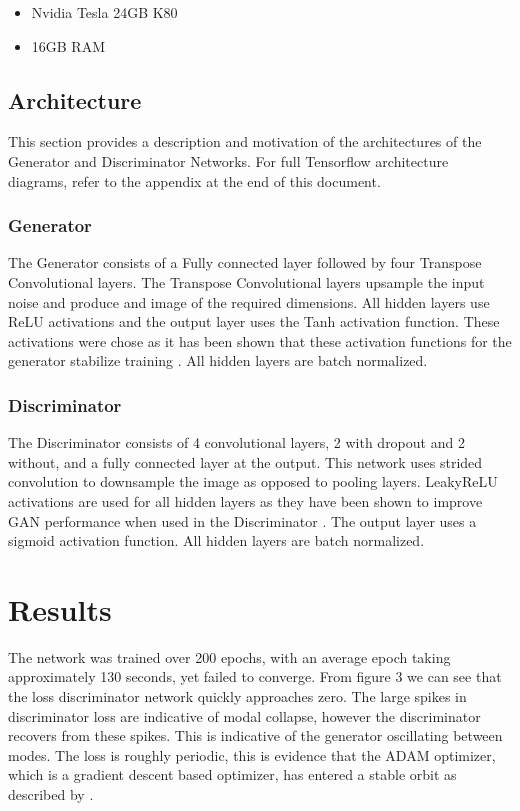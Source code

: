 \documentclass[conference]{IEEEtran}
\begin{document}
\begin{itemize}
    \item Nvidia Tesla 24GB K80 
    \item 16GB RAM 
\end{itemize}

\subsection{Architecture}

This section provides a description and motivation of the architectures of the Generator and Discriminator Networks. For full Tensorflow architecture diagrams, refer to the appendix at the end of this document.

\subsubsection{Generator}
The Generator consists of a Fully connected layer followed by four Transpose Convolutional layers. The Transpose Convolutional layers upsample the input noise and produce and image of the required dimensions.
All hidden layers use ReLU activations and the output layer uses the Tanh activation function. These activations were chose as it has been shown that these activation functions for the generator stabilize training \cite{radford2015unsupervised}. All hidden layers are batch normalized. 

\subsubsection{Discriminator}

The Discriminator consists of 4 convolutional layers, 2 with dropout and 2 without, and a fully connected layer at the output. This network uses strided convolution to downsample the image as opposed to pooling layers. LeakyReLU activations are used for all hidden layers as they have been shown to improve GAN performance when used in the Discriminator \cite{radford2015unsupervised}. The output layer uses a sigmoid activation function. All hidden layers are batch normalized.

\section{Results}

The network was trained over 200 epochs, with an average epoch taking approximately 130 seconds, yet failed to converge. From figure 3 we can see that the loss discriminator network quickly approaches zero. The large spikes in discriminator loss are indicative of modal collapse, however the discriminator recovers from these spikes. This is indicative of the generator oscillating between modes. The loss is roughly periodic, this is evidence that the ADAM optimizer, which is a gradient descent based optimizer, has entered a stable orbit as described by \citet{salimans2016improved}. \\
\end{document}
